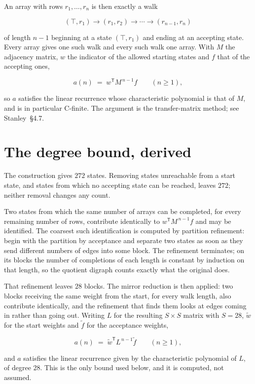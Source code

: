 \documentclass[11pt]{article}
\theoremstyle{definition}
\begin{document}
An array with rows $r_1,\dots,r_n$ is then exactly a walk

\[(\top,r_1) \to (r_1,r_2) \to \cdots \to (r_{n-1},r_n)\]

of length $n-1$ beginning at a state $(\top,r_1)$ and ending at an accepting state. Every array gives one such walk and every such walk one array. With $M$ the adjacency matrix, $w$ the indicator of the allowed starting states and $f$ that of the accepting ones,

\[a(n) \;=\; w^{\mathsf T} M^{\,n-1} f \qquad (n \ge 1),\]

so $a$ satisfies the linear recurrence whose characteristic polynomial is that of $M$, and is in particular C-finite. The argument is the transfer-matrix method; see Stanley~\S4.7.

\section{The degree bound, derived}

The construction gives $272$ states. Removing states unreachable from a start state, and states from which no accepting state can be reached, leaves $272$; neither removal changes any count.

Two states from which the same number of arrays can be completed, for every remaining number of rows, contribute identically to $w^{\mathsf T}M^{\,n-1}f$ and may be identified. The coarsest such identification is computed by partition refinement: begin with the partition by acceptance and separate two states as soon as they send different numbers of edges into some block. The refinement terminates; on its blocks the number of completions of each length is constant by induction on that length, so the quotient digraph counts exactly what the original does.

That refinement leaves $28$ blocks. The mirror reduction is then applied: two blocks receiving the same weight from the start, for every walk length, also contribute identically, and the refinement that finds them looks at edges coming in rather than going out. Writing $L$ for the resulting $S \times S$ matrix with $S = 28$, $\tilde w$ for the start weights and $\tilde f$ for the acceptance weights,

\[a(n) \;=\; \tilde w^{\mathsf T} L^{\,n-1} \tilde f \qquad (n \ge 1),\]

and $a$ satisfies the linear recurrence given by the characteristic polynomial of $L$, of degree $28$. This is the only bound used below, and it is computed, not assumed.
\end{document}
